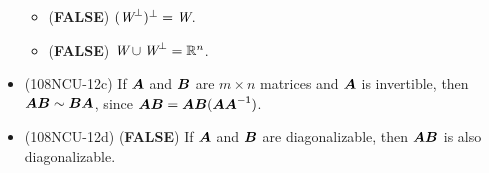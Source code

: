 \begin{itemize}
\begin{itemize}
        \item (\textbf{FALSE}) $(\textit{W}^{\bot})^{\bot} = \textit{W}$.
        \item (\textbf{FALSE}) $\textit{W} \cup \textit{W}^\perp = \mathbb{R}^n$.
    \end{itemize}
    \item (108NCU-12c) If $\boldsymbol{A}$ and $\boldsymbol{B}$ are $m \times n$ matrices and $\boldsymbol{A}$ is invertible, then $\boldsymbol{A}\boldsymbol{B} \sim \boldsymbol{B}\boldsymbol{A}$, since $\boldsymbol{A}\boldsymbol{B} = \boldsymbol{A}\boldsymbol{B}(\boldsymbol{A}\boldsymbol{A}^{\mathsf{-1}})$.
    \item (108NCU-12d) (\textbf{FALSE}) If $\boldsymbol{A}$ and $\boldsymbol{B}$ are diagonalizable, then $\boldsymbol{A}\boldsymbol{B}$ is also diagonalizable.
\end{itemize}

\pagebreak
